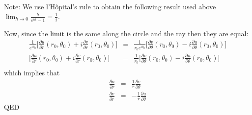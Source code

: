 \documentclass[12pt]{article}
\begin{document}
Note: We use l'H\^opital's rule to obtain the following result used above $\lim_{h\to 0} \frac{h}{e^{ih}-1} =  \frac{1}{i}$.

Now, since the limit is the same along the circle and the ray then they are equal:
\begin{eqnarray*}
\frac{1}{e^{i\theta_0}}\Bigg[ \frac{\partial u}{\partial r}(r_0,\theta_0) + i\frac{\partial v}{\partial r}(r_0,\theta_0) \Bigg]
& = & \frac{1}{r_0e^{i\theta_0}} \Bigg[ \frac{\partial v}{\partial \theta}(r_0,\theta_0) - i\frac{\partial u}{\partial \theta}(r_0,\theta_0) \Bigg]\\
\Bigg[ \frac{\partial u}{\partial r}(r_0,\theta_0) + i\frac{\partial v}{\partial r}(r_0,\theta_0) \Bigg]
& = & \frac{1}{r_0} \Bigg[ \frac{\partial v}{\partial \theta}(r_0,\theta_0) - i\frac{\partial u}{\partial \theta}(r_0,\theta_0) \Bigg]\\
\end{eqnarray*}
which implies that
\begin{eqnarray*}
\frac{\partial u}{\partial r} & = & \frac{1}{r}\frac{\partial v}{\partial \theta}\\
\frac{\partial v}{\partial r} & = & -\frac{1}{r}\frac{\partial u}{\partial \theta}
\end{eqnarray*}
QED
\end{document}
